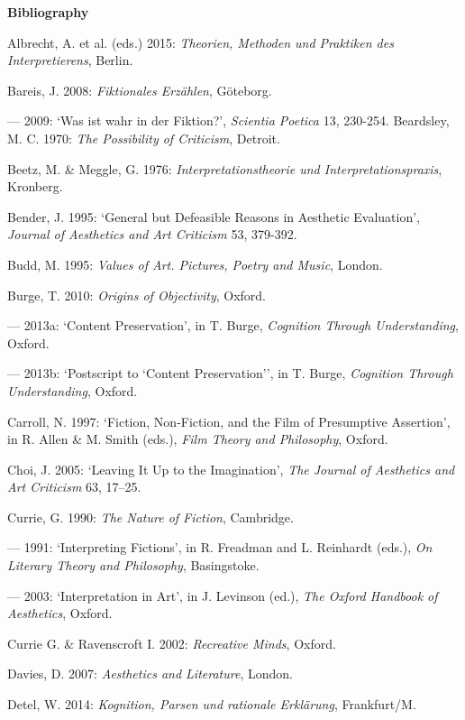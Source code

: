 \vspace{.2cm}
\noindent\textbf{\large Bibliography}
\vspace{.2cm}

\begin{hangparas}{.5cm}{1}

Albrecht, A. et al. (eds.) 2015: \emph{Theorien, Methoden und Praktiken des Interpretierens}, Berlin.

Bareis, J. 2008: \emph{Fiktionales Erz\"ahlen}, G\"oteborg.

--- 2009: `Was ist wahr in der Fiktion?', \emph{Scientia Poetica} 13, 230-254. 
Beardsley, M. C. 1970: \emph{The Possibility of Criticism}, Detroit.

Beetz, M. \& Meggle, G. 1976: \emph{Interpretationstheorie und Interpretationspraxis}, Kronberg.

Bender, J. 1995: `General but Defeasible Reasons in Aesthetic Evaluation', \emph{Journal of Aesthetics and Art Criticism} 53, 379-392.

Budd, M. 1995: \emph{Values of Art. Pictures, Poetry and Music}, London. 

Burge, T. 2010: \emph{Origins of Objectivity}, Oxford.

--- 2013a: `Content Preservation', in T. Burge, \emph{Cognition Through Understanding}, Oxford.

--- 2013b: `Postscript to `Content Preservation'', in T. Burge, \emph{Cognition Through Understanding}, Oxford.

Carroll, N. 1997: `Fiction, Non-Fiction, and the Film of Presumptive Assertion', in R. Allen \& M. Smith (eds.), \emph{Film Theory and Philosophy}, Oxford.

Choi, J. 2005: `Leaving It Up to the Imagination', \emph{The Journal of Aesthetics and Art Criticism} 63, 17--25. 

Currie, G. 1990: \emph{The Nature of Fiction}, Cambridge. 

--- 1991: `Interpreting Fictions', in R. Freadman and L. Reinhardt (eds.), \emph{On Literary Theory and Philosophy}, Basingstoke. 

--- 2003: `Interpretation in Art', in J. Levinson (ed.), \emph{The Oxford Handbook of Aesthetics}, Oxford.

Currie G. \& Ravenscroft I. 2002: \emph{Recreative Minds}, Oxford.

Davies, D. 2007: \emph{Aesthetics and Literature}, London.

Detel, W. 2014: \emph{Kognition, Parsen und rationale Erkl\"arung}, Frankfurt/M.


\end{hangparas}
